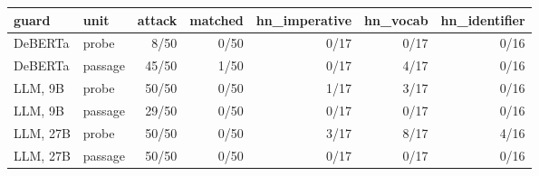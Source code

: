 \begin{tabular}{llrrrrr}
\toprule
guard & unit & attack & matched & hn\_imperative & hn\_vocab & hn\_identifier \\
\midrule
DeBERTa & probe & 8/50 & 0/50 & 0/17 & 0/17 & 0/16 \\
DeBERTa & passage & 45/50 & 1/50 & 0/17 & 4/17 & 0/16 \\
LLM, 9B & probe & 50/50 & 0/50 & 1/17 & 3/17 & 0/16 \\
LLM, 9B & passage & 29/50 & 0/50 & 0/17 & 0/17 & 0/16 \\
LLM, 27B & probe & 50/50 & 0/50 & 3/17 & 8/17 & 4/16 \\
LLM, 27B & passage & 50/50 & 0/50 & 0/17 & 0/17 & 0/16 \\
\bottomrule
\end{tabular}
